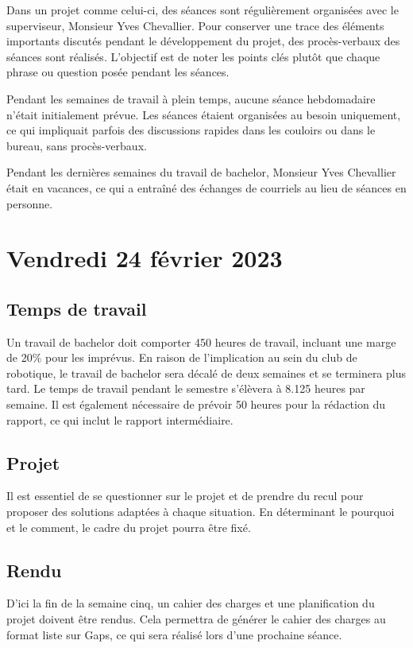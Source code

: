 Dans un projet comme celui-ci, des séances sont régulièrement organisées avec le superviseur, Monsieur Yves Chevallier.
Pour conserver une trace des éléments importants discutés pendant le développement du projet, des procès-verbaux des séances sont réalisés.
L'objectif est de noter les points clés plutôt que chaque phrase ou question posée pendant les séances.

Pendant les semaines de travail à plein temps, aucune séance hebdomadaire n'était initialement prévue. Les séances étaient organisées au besoin uniquement, ce qui impliquait parfois des discussions rapides dans les couloirs ou dans le bureau, sans procès-verbaux.

Pendant les dernières semaines du travail de bachelor, Monsieur Yves Chevallier était en vacances, ce qui a entraîné des échanges de courriels au lieu de séances en personne.

\section{Vendredi 24 février 2023}

\subsection{Temps de travail}

Un travail de bachelor doit comporter 450 heures de travail, incluant une marge de 20\% pour les imprévus.
En raison de l'implication au sein du club de robotique, le travail de bachelor sera décalé de deux semaines et se terminera plus tard.
Le temps de travail pendant le semestre s'élèvera à 8.125 heures par semaine.
Il est également nécessaire de prévoir 50 heures pour la rédaction du rapport, ce qui inclut le rapport intermédiaire.

\subsection{Projet}

Il est essentiel de se questionner sur le projet et de prendre du recul pour proposer des solutions adaptées à chaque situation.
En déterminant le pourquoi et le comment, le cadre du projet pourra être fixé.

\subsection{Rendu}

D'ici la fin de la semaine cinq, un cahier des charges et une planification du projet doivent être rendus.
Cela permettra de générer le cahier des charges au format liste sur Gaps, ce qui sera réalisé lors d'une prochaine séance.

